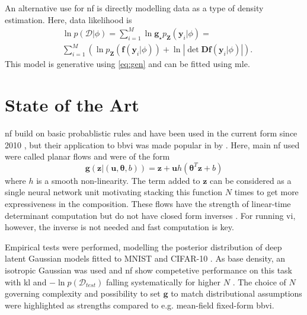 \documentclass[12pt,fleqn,twocolumn]{article}
\newcommand{\ginv}{\mathbf f}
\newcommand{\push}{\mathbf g_\star p_\mathbf Z}
\begin{document}
An alternative use for \acrshort{nf} is directly modelling data as a type of density estimation.
Here, data likelihood is
\begin{align*}
    & \ln p (\mathcal D| \phi)  = \sum_{i=1}^M \ln \push(\mathbf y_i|\phi) = \\
    & \sum_{i=1}^M \left(
        \ln p_\mathbf Z(\ginv(\mathbf y_i|\phi)) + \ln \left| \det \mathbf D\ginv(\mathbf y_i|\phi)\right|
    \right).
\end{align*}
This model is generative using \eqref{eq:gen} and can be fitted using \acrfull{mle}.

\section*{State of the Art}%
\acrshort{nf} build on basic probablistic rules and have been used in the current form since 2010 \cite{koby2021nf}, but their application to \acrshort{bbvi} was made popular in \citeyear{JimenezRezende2015VariationalIW} by \textcite{JimenezRezende2015VariationalIW}.
Here, main \acrshort{nf} used were called planar flows and were of the form
\begin{equation}\label{eq:planar}
    \mathbf g(\mathbf z | (\mathbf u, \bm \theta, b)) = \mathbf z + \mathbf u h \left(\bm \theta ^T \mathbf z + b\right)
\end{equation}
where $h$ is a smooth non-linearity.
The term added to $\mathbf z$ can be considered as a single neural network unit motivating stacking this function $N$ times to get more expressiveness in the composition.
These flows have the strength of linear-time determinant computation but do not have closed form inverses \cite[Chap. 4.1]{JimenezRezende2015VariationalIW}.
For running \acrshort{vi}, however, the inverse is not needed and fast computation is key.

Empirical tests were performed, modelling the posterior distribution of deep latent Gaussian models fitted to MNIST and CIFAR-10 \cite[Chap. 6.2]{JimenezRezende2015VariationalIW}.
As base density, an isotropic Gaussian was used \cite[Chap. 6.1]{JimenezRezende2015VariationalIW} and \acrshort{nf} show competetive performance on this task with \acrshort{kl} and $-\ln p(\mathcal D_{test})$ falling systematically for higher $N$ \cite[Fig. 4, Tab. 2 and 3]{JimenezRezende2015VariationalIW}.
The choice of $N$ governing complexity and possibility to set $\mathbf g$ to match distributional assumptions were highlighted as strengths compared to e.g. mean-field fixed-form \acrshort{bbvi}.
\end{document}
